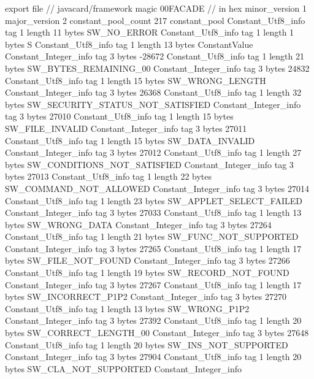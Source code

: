 export file {		// javacard/framework
	magic	00FACADE		 // in hex
	minor_version	1
	major_version	2
	constant_pool_count	217
	constant_pool {
		Constant_Utf8_info {
			tag	1
			length	11
			bytes	SW_NO_ERROR
		}
		Constant_Utf8_info {
			tag	1
			length	1
			bytes	S
		}
		Constant_Utf8_info {
			tag	1
			length	13
			bytes	ConstantValue
		}
		Constant_Integer_info {
			tag	3
			bytes	-28672
		}
		Constant_Utf8_info {
			tag	1
			length	21
			bytes	SW_BYTES_REMAINING_00
		}
		Constant_Integer_info {
			tag	3
			bytes	24832
		}
		Constant_Utf8_info {
			tag	1
			length	15
			bytes	SW_WRONG_LENGTH
		}
		Constant_Integer_info {
			tag	3
			bytes	26368
		}
		Constant_Utf8_info {
			tag	1
			length	32
			bytes	SW_SECURITY_STATUS_NOT_SATISFIED
		}
		Constant_Integer_info {
			tag	3
			bytes	27010
		}
		Constant_Utf8_info {
			tag	1
			length	15
			bytes	SW_FILE_INVALID
		}
		Constant_Integer_info {
			tag	3
			bytes	27011
		}
		Constant_Utf8_info {
			tag	1
			length	15
			bytes	SW_DATA_INVALID
		}
		Constant_Integer_info {
			tag	3
			bytes	27012
		}
		Constant_Utf8_info {
			tag	1
			length	27
			bytes	SW_CONDITIONS_NOT_SATISFIED
		}
		Constant_Integer_info {
			tag	3
			bytes	27013
		}
		Constant_Utf8_info {
			tag	1
			length	22
			bytes	SW_COMMAND_NOT_ALLOWED
		}
		Constant_Integer_info {
			tag	3
			bytes	27014
		}
		Constant_Utf8_info {
			tag	1
			length	23
			bytes	SW_APPLET_SELECT_FAILED
		}
		Constant_Integer_info {
			tag	3
			bytes	27033
		}
		Constant_Utf8_info {
			tag	1
			length	13
			bytes	SW_WRONG_DATA
		}
		Constant_Integer_info {
			tag	3
			bytes	27264
		}
		Constant_Utf8_info {
			tag	1
			length	21
			bytes	SW_FUNC_NOT_SUPPORTED
		}
		Constant_Integer_info {
			tag	3
			bytes	27265
		}
		Constant_Utf8_info {
			tag	1
			length	17
			bytes	SW_FILE_NOT_FOUND
		}
		Constant_Integer_info {
			tag	3
			bytes	27266
		}
		Constant_Utf8_info {
			tag	1
			length	19
			bytes	SW_RECORD_NOT_FOUND
		}
		Constant_Integer_info {
			tag	3
			bytes	27267
		}
		Constant_Utf8_info {
			tag	1
			length	17
			bytes	SW_INCORRECT_P1P2
		}
		Constant_Integer_info {
			tag	3
			bytes	27270
		}
		Constant_Utf8_info {
			tag	1
			length	13
			bytes	SW_WRONG_P1P2
		}
		Constant_Integer_info {
			tag	3
			bytes	27392
		}
		Constant_Utf8_info {
			tag	1
			length	20
			bytes	SW_CORRECT_LENGTH_00
		}
		Constant_Integer_info {
			tag	3
			bytes	27648
		}
		Constant_Utf8_info {
			tag	1
			length	20
			bytes	SW_INS_NOT_SUPPORTED
		}
		Constant_Integer_info {
			tag	3
			bytes	27904
		}
		Constant_Utf8_info {
			tag	1
			length	20
			bytes	SW_CLA_NOT_SUPPORTED
		}
		Constant_Integer_info {
}}}
